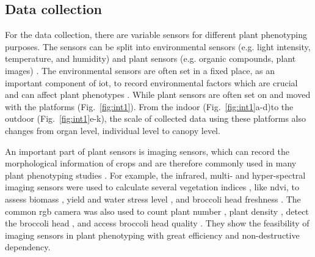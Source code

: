 \subsection{Data collection}
For the data collection, there are variable sensors for different plant phenotyping purposes. The sensors can be split into environmental sensors (e.g. light intensity, temperature, and humidity) and plant sensors (e.g. organic compounds, plant images) \citep{garlando_plants_2020}. The environmental sensors are often set in a fixed place, as an important component of \gls{iot}, to record environmental factors which are crucial and can affect plant phenotypes \citep{ghanem_physiological_2015}. While plant sensors are often set on and moved with the platforms (Fig.~\ref{fig:int1}). From the indoor (Fig.~\ref{fig:int1}a-d)to the outdoor (Fig.~\ref{fig:int1}e-k), the scale of collected data using these platforms also changes from organ level, individual level to canopy level.





An important part of plant sensors is imaging sensors, which can record the morphological information of crops and are therefore commonly used in many plant phenotyping studies \citep{paulus_measuring_2019, feng_comprehensive_2021}. For example, the infrared, multi- and hyper-spectral imaging sensors were used to calculate several vegetation indices \citep{han_modeling_2019}, like \gls{ndvi}, to assess biomass \citep{jimenez-berni_high_2018}, yield and water stress level \citep{herrero_yield_2020, romano_use_2011}, and broccoli head freshness \citep{guo_evaluation_2022}. The common \gls{rgb} camera was also used to count plant number \citep{liu_estimating_2022}, plant density \citep{velumani_estimates_2021}, detect the broccoli head \citep{blok_machine_2016}, and access broccoli head quality \citep{stansell_use_2017}. They show the feasibility of imaging sensors in plant phenotyping with great efficiency and non-destructive dependency.

